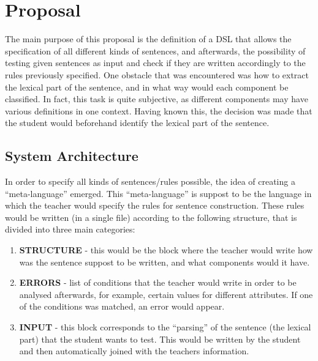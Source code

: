 \chapter{Proposal} \label{proposal}

The main purpose of this proposal is the definition of a \textsc{DSL} that allows the specification of all different kinds of sentences, and afterwards, the possibility of testing given sentences as input and check if they are written accordingly to the rules previously specified. One obstacle that was encountered was how to extract the lexical part of the sentence, and in what way would each component be classified. In fact, this task is quite subjective, as different components may have various definitions in one context. %
Having known this, the decision was made that the student would beforehand identify the lexical part of the sentence.

\section{System Architecture}
In order to specify all kinds of sentences/rules possible, the idea of creating a ``meta-language'' emerged. This ``meta-language'' is suppost to be the language in which the teacher would specify the rules for sentence construction. These rules would be written (in a single file) according to the following structure, that is divided into three main categories:

\begin{enumerate}
    \item \textbf{STRUCTURE} - this would be the block where the teacher would write how was the sentence suppost to be written, and what components would it have.
    
    \item \textbf{ERRORS} - list of conditions that the teacher would write in order to be analysed afterwards, for example, certain values for different attributes. If one of the conditions was matched, an error would appear.
    
    \item \textbf{INPUT} - this block corresponds to the ``parsing'' of the sentence (the lexical part) that the student wants to test. This would be written by the student and then automatically joined with the teachers information.
\end{enumerate}

